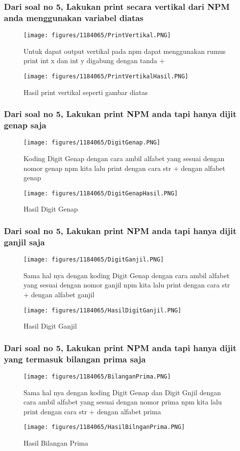 \subsubsection{Dari soal no 5, Lakukan print secara vertikal dari NPM anda menggunakan variabel diatas}
\begin{figure}[H]
		\texttt{[image: figures/1184065/PrintVertikal.PNG]}
		\centering
		\caption{Untuk dapat output vertikal pada npm dapat menggunakan rumus print int x dan int y digabung dengan tanda +}
\end{figure}
\begin{figure}[H]
		\texttt{[image: figures/1184065/PrintVertikalHasil.PNG]}
		\centering
		\caption{Hasil print vertikal seperti gambar diatas}
\end{figure}
\subsubsection{Dari soal no 5, Lakukan print NPM anda tapi hanya dijit genap saja}
\begin{figure}[H]
		\texttt{[image: figures/1184065/DigitGenap.PNG]}
		\centering
		\caption{Koding Digit Genap dengan cara ambil alfabet yang sesuai dengan nomor genap npm kita lalu print dengan cara str + dengan alfabet genap}
\end{figure}
\begin{figure}[H]
		\texttt{[image: figures/1184065/DigitGenapHasil.PNG]}
		\centering
		\caption{Hasil Digit Genap}
\end{figure}
\subsubsection{Dari soal no 5, Lakukan print NPM anda tapi hanya dijit ganjil saja}
\begin{figure}[H]
		\texttt{[image: figures/1184065/DigitGanjil.PNG]}
		\centering
		\caption{Sama hal nya dengan koding Digit Genap dengan cara ambil alfabet yang sesuai dengan nomor ganjil npm kita lalu print dengan cara str + dengan alfabet ganjil}
\end{figure}
\begin{figure}[H]
		\texttt{[image: figures/1184065/HasilDigitGanjil.PNG]}
		\centering
		\caption{Hasil Digit Ganjil}
\end{figure}
\subsubsection{Dari soal no 5, Lakukan print NPM anda tapi hanya dijit yang termasuk bilangan prima saja}
\begin{figure}[H]
		\texttt{[image: figures/1184065/BilanganPrima.PNG]}
		\centering
		\caption{Sama hal nya dengan koding Digit Genap dan Digit Gnjil dengan cara ambil alfabet yang sesuai dengan nomor prima npm kita lalu print dengan cara str + dengan alfabet prima}
\end{figure}
\begin{figure}[H]
		\texttt{[image: figures/1184065/HasilBilnganPrima.PNG]}
		\centering
		\caption{Hasil Bilangan Prima}
\end{figure}
\hfill\break
